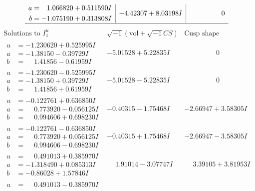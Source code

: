 \documentclass[1p]{elsarticle_modified}
\theoremstyle{definition}
\newcommand{\I}{\sqrt{-1}}
\begin{document}
$$\begin{array}{c|c|c}
\begin{aligned}
a &= \phantom{-}1.066820 + 0.511590 I \\
b &= -1.075190 + 0.313808 I\end{aligned}
 & -4.42307 + 8.03198 I & \phantom{-0.000000 } 0\\
 \hline 
 \end{array}$$\newpage$$\begin{array}{c|c|c}  
\text{Solutions to }I^u_{1}& \I (\text{vol} + \sqrt{-1}CS) & \text{Cusp shape}\\
 \hline 
\begin{aligned}
u &= -1.230620 + 0.525995 I \\
a &= -1.38150 - 0.39729 I \\
b &= \phantom{-}1.41856 - 0.61959 I\end{aligned}
 & -5.01528 + 5.22835 I & \phantom{-0.000000 } 0 \\ \hline\begin{aligned}
u &= -1.230620 - 0.525995 I \\
a &= -1.38150 + 0.39729 I \\
b &= \phantom{-}1.41856 + 0.61959 I\end{aligned}
 & -5.01528 - 5.22835 I & \phantom{-0.000000 } 0 \\ \hline\begin{aligned}
u &= -0.122761 + 0.636850 I \\
a &= \phantom{-}0.773920 - 0.056125 I \\
b &= \phantom{-}0.994606 + 0.698230 I\end{aligned}
 & -0.40315 - 1.75468 I & -2.66947 + 3.58305 I \\ \hline\begin{aligned}
u &= -0.122761 - 0.636850 I \\
a &= \phantom{-}0.773920 + 0.056125 I \\
b &= \phantom{-}0.994606 - 0.698230 I\end{aligned}
 & -0.40315 + 1.75468 I & -2.66947 - 3.58305 I \\ \hline\begin{aligned}
u &= \phantom{-}0.491013 + 0.385970 I \\
a &= -1.318490 + 0.085313 I \\
b &= -0.86028 + 1.57846 I\end{aligned}
 & \phantom{-}1.91014 - 3.07747 I & \phantom{-}3.39105 + 3.81953 I \\ \hline\begin{aligned}
u &= \phantom{-}0.491013 - 0.385970 I \\

\end{aligned}
\end{array}$$
\end{document}
